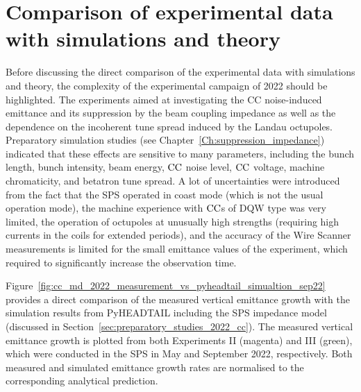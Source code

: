



\section{Comparison of experimental data with simulations and theory}\label{sec:compare_measurements_pyheadtail_theory}

Before discussing the direct comparison of the experimental data with simulations and theory, the complexity of the experimental campaign of 2022 should be highlighted. The experiments aimed at investigating the CC noise-induced emittance and its suppression by the beam coupling impedance as well as the dependence on the incoherent tune spread induced by the Landau octupoles. Preparatory simulation studies (see Chapter~\ref{Ch:suppression_impedance}) indicated that these effects are sensitive to many parameters, including the bunch length, bunch intensity, beam energy, ${\mathrm{CC}}$ noise level, ${\mathrm{CC}}$ voltage, machine chromaticity, and betatron tune spread. A lot of uncertainties were introduced from the fact that the SPS operated in coast mode (which is not the usual operation mode), the machine experience with ${\mathrm{CC}}$s of DQW type was very limited, the operation of octupoles at unusually high strengths (requiring high currents in the coils for extended periods), %
and the accuracy of the Wire Scanner measurements is limited for the small emittance values of the experiment, which required to significantly increase the observation time. %


Figure~\ref{fig:cc_md_2022_measurement_vs_pyheadtail_simualtion_sep22} provides a direct comparison of the measured vertical emittance growth with the simulation results from PyHEADTAIL including the SPS impedance model (discussed in Section~\ref{sec:preparatory_studies_2022_cc}). The measured vertical emittance growth is plotted from both Experiments II (magenta) and III (green), which were conducted in the SPS in May and September 2022, respectively. Both measured and simulated emittance growth rates are normalised to the corresponding analytical prediction.


